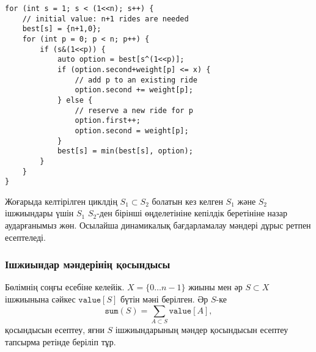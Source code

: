
\begin{lstlisting}
for (int s = 1; s < (1<<n); s++) {
    // initial value: n+1 rides are needed
    best[s] = {n+1,0};
    for (int p = 0; p < n; p++) {
        if (s&(1<<p)) {
            auto option = best[s^(1<<p)];
            if (option.second+weight[p] <= x) {
                // add p to an existing ride
                option.second += weight[p];
            } else {
                // reserve a new ride for p
                option.first++;
                option.second = weight[p];
            }
            best[s] = min(best[s], option);
        }
    }
}
\end{lstlisting}
Жоғарыда келтірілген циклдің $S_1 \subset S_2$ болатын
кез келген $S_1$ және $S_2$
ішжиындары үшін $S_1$ $S_2$-ден бірінші өңделетініне кепілдік беретініне назар аударғанымыз жөн.
Осылайша динамикалық бағдарламалау мәндері дұрыс ретпен есептеледі.

\subsubsection{Ішжиындар мәндерінің қосындысы} %

Бөлімнің соңғы есебіне келейік. 
$X=\{0 \ldots n-1\}$ жиыны мен әр $S \subset X$
ішжиынына сәйкес $\texttt{value}[S]$ бүтін мәні берілген.
Әр $S$-ке
\[\texttt{sum}(S) = \sum_{A \subset S} \texttt{value}[A],\]
қосындысын есептеу, яғни $S$ ішжиындарының мәндер қосындысын есептеу тапсырма ретінде беріліп тұр.



